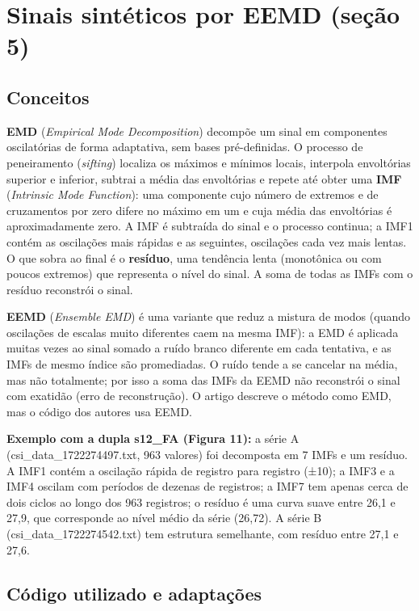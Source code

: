 \section{Sinais sintéticos por EEMD (seção 5)}

\subsection{Conceitos}

\textbf{EMD} (\textit{Empirical Mode Decomposition}) decompõe um sinal em componentes oscilatórias de forma adaptativa, sem bases pré-definidas. O processo de peneiramento (\textit{sifting}) localiza os máximos e mínimos locais, interpola envoltórias superior e inferior, subtrai a média das envoltórias e repete até obter uma \textbf{IMF} (\textit{Intrinsic Mode Function}): uma componente cujo número de extremos e de cruzamentos por zero difere no máximo em um e cuja média das envoltórias é aproximadamente zero. A IMF é subtraída do sinal e o processo continua; a IMF1 contém as oscilações mais rápidas e as seguintes, oscilações cada vez mais lentas. O que sobra ao final é o \textbf{resíduo}, uma tendência lenta (monotônica ou com poucos extremos) que representa o nível do sinal. A soma de todas as IMFs com o resíduo reconstrói o sinal.

\textbf{EEMD} (\textit{Ensemble EMD}) é uma variante que reduz a mistura de modos (quando oscilações de escalas muito diferentes caem na mesma IMF): a EMD é aplicada muitas vezes ao sinal somado a ruído branco diferente em cada tentativa, e as IMFs de mesmo índice são promediadas. O ruído tende a se cancelar na média, mas não totalmente; por isso a soma das IMFs da EEMD não reconstrói o sinal com exatidão (erro de reconstrução). O artigo descreve o método como EMD, mas o código dos autores usa EEMD.

\textbf{Exemplo com a dupla s12\_FA (Figura 11):} a série A (csi\_data\_1722274497.txt, 963 valores) foi decomposta em 7 IMFs e um resíduo. A IMF1 contém a oscilação rápida de registro para registro (±10); a IMF3 e a IMF4 oscilam com períodos de dezenas de registros; a IMF7 tem apenas cerca de dois ciclos ao longo dos 963 registros; o resíduo é uma curva suave entre 26,1 e 27,9, que corresponde ao nível médio da série (26,72). A série B (csi\_data\_1722274542.txt) tem estrutura semelhante, com resíduo entre 27,1 e 27,6.

\subsection{Código utilizado e adaptações}

